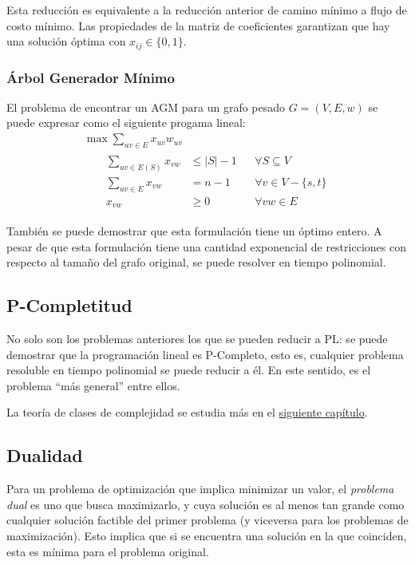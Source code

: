 Esta reducción es equivalente a la reducción anterior de camino mínimo a flujo de costo mínimo. Las propiedades de la matriz de coeficientes garantizan que hay una solución óptima con $x_{ij} \in \{0, 1\}$.

\subsubsection{Árbol Generador Mínimo}

El problema de encontrar un AGM para un grafo pesado $G = (V, E, w)$ se puede expresar como el siguiente progama lineal:
\begin{gather*}
    \max{\sum_{uv \in E} x_{uv} w_{uv}} \\
    \begin{flalign*}
         &  & \sum_{uv \in E(S)} x_{vw} & \leq |S| - 1 &  & \forall S \subseteq V      \\
         &  & \sum_{uv \in E} x_{vw}    & = n - 1      &  & \forall v \in V - \{s, t\} \\
         &  & x_{vw}                    & \geq 0       &  & \forall vw \in E
    \end{flalign*}
\end{gather*}

También se puede demostrar que esta formulación tiene un óptimo entero. A pesar de que esta formulación tiene una cantidad exponencial de restricciones con respecto al tamaño del grafo original, se puede resolver en tiempo polinomial.

\subsection{P-Completitud}

No solo son los problemas anteriores los que se pueden reducir a PL: se puede demostrar que la programación lineal es P-Completo, esto es, cualquier problema resoluble en tiempo polinomial se puede reducir a él. En este sentido, es el problema ``más general'' entre ellos.

La teoría de clases de complejidad se estudia más en el \hyperref[capitulo-np-completitud]{siguiente capítulo}.

\subsection{Dualidad}

Para un problema de optimización que implica minimizar un valor, el \textit{problema dual} es uno que busca maximizarlo, y cuya solución es al menos tan grande como cualquier solución factible del primer problema (y viceversa para los problemas de maximización). Esto implica que si se encuentra una solución en la que coinciden, esta es mínima para el problema original.

